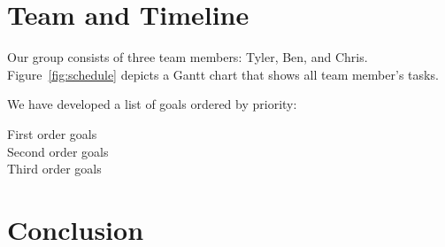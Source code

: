 \documentclass{acm_proc_article-sp}
\begin{document}
\section{Team and Timeline}

Our group consists of three team members: Tyler, Ben, and Chris.
Figure~\ref{fig:schedule} depicts a Gantt chart that shows all team member's
tasks. 

We have developed a list of goals ordered by priority:
\begin{description}
	\item[First order goals]
	\item[Second order goals]
	\item[Third order goals]
\end{description}

\section{Conclusion}


\end{document}
